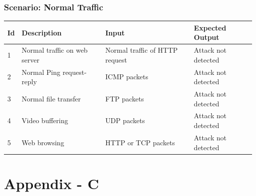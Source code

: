 \documentclass[12pt,a4paper,final]{report}
\DeclareRobustCommand{\gobblefive}[5]{}
\newcommand*{\SkipTocEntry}{\addtocontents{toc}{\gobblefive}}
\begin{document}
{{{{\SkipTocEntry\subsection{Scenario: Normal Traffic}
\begin{center}
\begin{tabular}{|p{1cm}|p{3cm}|p{3cm}|p{3.5cm}|}
\hline 
 \textbf{Id} & \textbf{Description} & \textbf{Input} & \textbf{Expected Output} \\ 
\hline 
 1 & Normal traffic on web server & Normal traffic of HTTP request & Attack not detected\\
 \hline
 2 & Normal Ping request-reply & ICMP packets & Attack not detected\\ 
 \hline
 3 & Normal file transfer & FTP packets & Attack not detected\\
 \hline
 4 & Video buffering & UDP packets & Attack not detected\\
 \hline
 5 & Web browsing & HTTP or TCP packets & Attack not detected\\
\hline 
\end{tabular} 
\end{center}
\newpage

\SkipTocEntry\chapter{Appendix - C}
\thispagestyle{empty}
\newpage

}}}}
\end{document}

